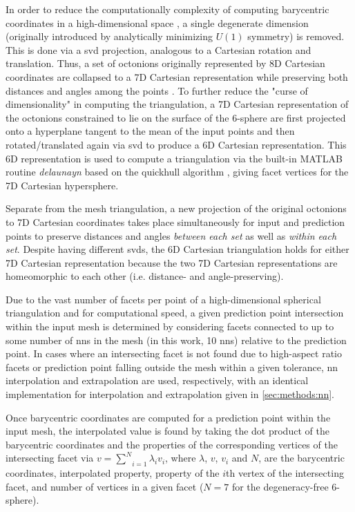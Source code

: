 \documentclass[preprint,12pt]{elsarticle}
\begin{document}
In order to reduce the computationally complexity of computing barycentric coordinates in a high-dimensional space \cite{qhull}, a single degenerate dimension (originally introduced by analytically minimizing $U(1)$ symmetry) is removed. This is done via a \gls{svd} projection, analogous to a Cartesian rotation and translation. Thus, a set of octonions originally represented by 8D Cartesian coordinates are collapsed to a 7D Cartesian representation while preserving both distances and angles among the points \cite{}. To further reduce the "curse of dimensionality" in computing the triangulation, a 7D Cartesian representation of the octonions constrained to lie on the surface of the 6-sphere are first projected onto a hyperplane tangent to the mean of the input points and then rotated/translated again via \gls{svd} to produce a 6D Cartesian representation. This 6D representation is used to compute a triangulation via the built-in MATLAB routine \textit{delaunayn} based on the quickhull algorithm \cite{qhull}, giving facet vertices for the 7D Cartesian hypersphere.

Separate from the mesh triangulation, a new projection of the original octonions to 7D Cartesian coordinates takes place simultaneously for input and prediction points to preserve distances and angles \textit{between each set} as well as \textit{within each set}. Despite having different \glspl{svd}, the 6D Cartesian triangulation holds for either 7D Cartesian representation because the two 7D Cartesian representations are homeomorphic to each other (i.e. distance- and angle-preserving).

Due to the vast number of facets per point of a high-dimensional spherical triangulation and for computational speed, a given prediction point intersection within the input mesh is determined by considering facets connected to up to some number of \glspl{nn} in the mesh (in this work, 10 \glspl{nn}) relative to the prediction point. In cases where an intersecting facet is not found due to high-aspect ratio facets or prediction point falling outside the mesh within a given tolerance, \gls{nn} interpolation and extrapolation are used, respectively, with an identical implementation for interpolation and extrapolation given in \ref{sec:methods:nn}.

Once barycentric coordinates are computed for a prediction point within the input mesh, the interpolated value is found by taking the dot product of the barycentric coordinates and the properties of the corresponding vertices of the intersecting facet via $v=\underset{i=1}{\overset{N}{\sum }}\lambda _i v_i$, where $\lambda$, $v$, $v_i$ and $N$, are the barycentric coordinates, interpolated property, property of the $i$th vertex of the intersecting facet, and number of vertices in a given facet ($N = 7$ for the degeneracy-free 6-sphere).
    
\end{document}
